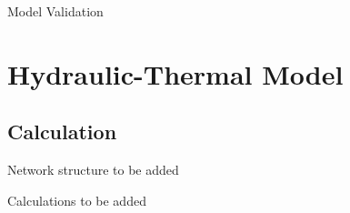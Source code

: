 \documentclass[xcolor=dvipsnames]{beamer}
\begin{document}
\begin{frame}{Model Validation}
	
\end{frame}

\section{Hydraulic-Thermal Model}

\subsection{Calculation}

\begin{frame}{Network structure}
	to be added
\end{frame}

\begin{frame}{Calculations}
		to be added
\end{frame}
\end{document}
